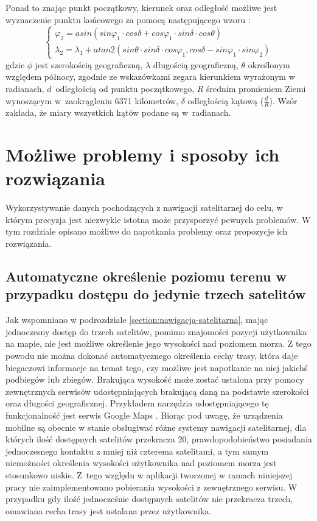 Ponad to znając punkt początkowy, kierunek oraz odległość możliwe jest wyznaczenie punktu końcowego za pomocą następującego wzoru \cite{haversine}:
\begin{equation}\label{eq:haversine_generowanie_punktu}
\begin{cases}\varphi_2=asin(sin{ \varphi_1 } \cdot cos{ \delta } + cos{\varphi_1} \cdot sin{\delta} \cdot cos{ \theta })\\
\lambda_2 = \lambda_1 + atan2(sin \theta \cdot sin \delta \cdot cos \varphi_1, cos \delta -sin \varphi_1 \cdot sin  \varphi_2 )
\end{cases}
\end{equation}
gdzie \(\phi\) jest szerokością geograficzną, \(\lambda\) długością geograficzną, \(\theta\) określonym względem północy, zgodnie ze wskazówkami zegara kierunkiem wyrażonym w radianach, \(d\)~odległością od punktu początkowego,
\(R\) średnim promieniem Ziemi wynoszącym w~zaokrągleniu 6371 kilometrów, \(\delta\) odległością kątową (\(\frac{d}{R}\)). Wzór zakłada, że miary wszystkich kątów podane są w~radianach.

\section{Możliwe problemy i sposoby ich rozwiązania}
Wykorzystywanie danych pochodzących z nawigacji satelitarnej do celu, w którym precyzja jest niezwykle istotna może przysporzyć pewnych problemów. W tym rozdziale opisano możliwe do napotkania problemy oraz propozycje ich rozwiązania.
\subsection{Automatyczne określenie poziomu terenu w przypadku dostępu do jedynie trzech satelitów}\label{chap:problem-poziom-terenu}
Jak wspomniano w podrozdziale \ref{section:nawigacja-satelitarna}, mając jednoczesny dostęp do trzech satelitów, pomimo znajomości pozycji użytkownika na mapie, nie jest możliwe określenie jego wysokości nad poziomem morza. Z tego powodu nie można dokonać automatycznego określenia cechy trasy, która daje biegaczowi informacje na temat tego, czy możliwe jest napotkanie na niej jakichś podbiegów lub zbiegów. Brakująca wysokość może zostać ustalona przy pomocy zewnętrznych serwisów udostępniających brakującą daną na podstawie szerokości oraz długości geograficznej. Przykładem narzędzia udostępniającego tę funkcjonalność jest serwis Google Maps \cite{googlemaps}. Biorąc pod uwagę, że urządzenia mobilne są obecnie w stanie obsługiwać różne systemy nawigacji satelitarnej, dla których ilość dostępnych satelitów przekracza 20, prawdopodobieństwo posiadania jednoczesnego kontaktu z mniej niż czterema satelitami, a tym samym niemożności określenia wysokości użytkownika nad poziomem morza jest stosunkowo niskie. Z~tego względu w aplikacji tworzonej w ramach niniejszej pracy nie zaimplementowano pobierania wysokości z zewnętrznego serwisu. W przypadku gdy ilość jednocześnie dostępnych satelitów nie przekracza trzech, omawiana cecha trasy jest ustalana przez użytkownika.
